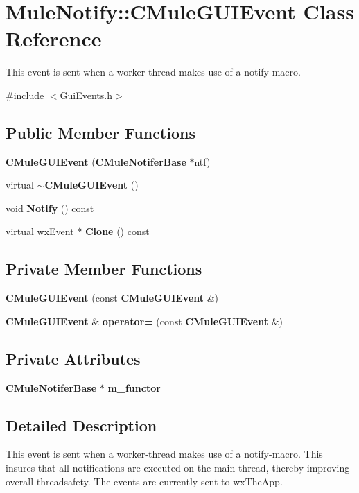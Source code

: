 \section{MuleNotify::CMuleGUIEvent Class Reference}
\label{classMuleNotify_1_1CMuleGUIEvent}


This event is sent when a worker-\/thread makes use of a notify-\/macro.  


{\ttfamily \#include $<$GuiEvents.h$>$}\subsection*{Public Member Functions}
\begin{DoxyCompactItemize}
\item 
{\bf CMuleGUIEvent} ({\bf CMuleNotiferBase} $\ast$ntf)
\item 
virtual {\bf $\sim$CMuleGUIEvent} ()
\item 
void {\bf Notify} () const 
\item 
virtual wxEvent $\ast$ {\bf Clone} () const 
\end{DoxyCompactItemize}
\subsection*{Private Member Functions}
\begin{DoxyCompactItemize}
\item 
{\bf CMuleGUIEvent} (const {\bf CMuleGUIEvent} \&)
\item 
{\bf CMuleGUIEvent} \& {\bf operator=} (const {\bf CMuleGUIEvent} \&)
\end{DoxyCompactItemize}
\subsection*{Private Attributes}
\begin{DoxyCompactItemize}
\item 
{\bf CMuleNotiferBase} $\ast$ {\bf m\_\-functor}\label{classMuleNotify_1_1CMuleGUIEvent_a739c7e1aa1a62d93887561c483a51817}

\end{DoxyCompactItemize}


\subsection{Detailed Description}
This event is sent when a worker-\/thread makes use of a notify-\/macro. This insures that all notifications are executed on the main thread, thereby improving overall threadsafety. The events are currently sent to wxTheApp. 

